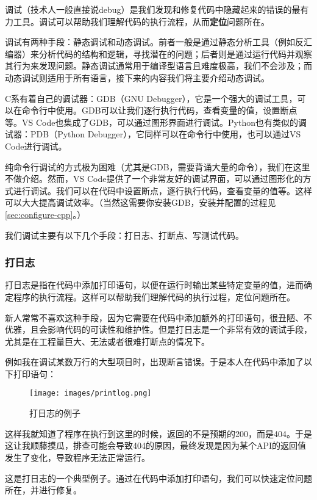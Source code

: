 \documentclass[../main.tex]{subfiles}
\begin{document}
调试（技术人一般直接说debug）是我们发现和修复代码中隐藏起来的错误的最有力工具。调试可以帮助我们理解代码的执行流程，从而\textbf{定位}问题所在。

调试有两种手段：静态调试和动态调试。前者一般是通过静态分析工具（例如反汇编器）来分析代码的结构和逻辑，寻找潜在的问题；后者则是通过运行代码并观察其行为来发现问题。静态调试通常用于编译型语言且难度极高，我们不会涉及；而动态调试则适用于所有语言，接下来的内容我们将主要介绍动态调试。

C系有着自己的调试器：GDB（GNU Debugger），它是一个强大的调试工具，可以在命令行中使用。GDB可以让我们逐行执行代码，查看变量的值，设置断点等。VS Code也集成了GDB，可以通过图形界面进行调试。Python也有类似的调试器：PDB（Python Debugger），它同样可以在命令行中使用，也可以通过VS Code进行调试。

纯命令行调试的方式极为困难（尤其是GDB，需要背诵大量的命令），我们在这里不做介绍。然而，VS Code提供了一个非常友好的调试界面，可以通过图形化的方式进行调试。我们可以在代码中设置断点，逐行执行代码，查看变量的值等。这样可以大大提高调试效率。（当然这需要你安装GDB，安装并配置的过程见\ref{sec:configure-cpp}。）

我们调试主要有以下几个手段：打日志、打断点、写测试代码。

\subsubsection{打日志}

打日志是指在代码中添加打印语句，以便在运行时输出某些特定变量的值，进而确定程序的执行流程。这样可以帮助我们理解代码的执行过程，定位问题所在。

新人常常不喜欢这种手段，因为它需要在代码中添加额外的打印语句，很丑陋、不优雅，且会影响代码的可读性和维护性。但是打日志是一个非常有效的调试手段，尤其是在工程量巨大、无法或者很难打断点的情况下。

例如我在调试某数万行的大型项目时，出现断言错误。于是本人在代码中添加了以下打印语句：

\begin{figure}[htbp]
\centering
\texttt{[image: images/printlog.png]}
\caption{打日志的例子}
\end{figure}

这样我就知道了程序在执行到这里的时候，返回的不是预期的200，而是404。于是这让我顺藤摸瓜，排查可能会导致404的原因，最终发现是因为某个API的返回值发生了变化，导致程序无法正常运行。

这是打日志的一个典型例子。通过在代码中添加打印语句，我们可以快速定位问题所在，并进行修复。
\end{document}
